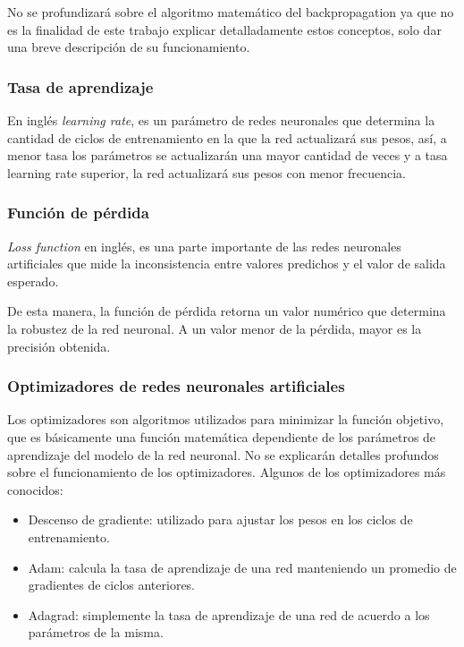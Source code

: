 \documentclass[a4paper,12pt,oneside,spanish]{book}
\begin{document}
No se profundizará sobre el algoritmo matemático del backpropagation ya que no es la finalidad de este trabajo explicar detalladamente estos conceptos, solo dar una breve descripción de su funcionamiento.\par


\subsubsection{Tasa de aprendizaje}
En inglés \textit{learning rate}, es un parámetro de redes neuronales que determina la cantidad de ciclos de entrenamiento en la que la red actualizará sus pesos, así, a menor tasa los parámetros se actualizarán una mayor cantidad de veces y a tasa learning rate superior, la red actualizará sus pesos con menor frecuencia.

\subsubsection{Función de pérdida}
\textit{Loss function} en inglés, es una parte importante de las redes neuronales artificiales que mide la inconsistencia entre valores predichos y el valor de salida esperado. \par

De esta manera, la función de pérdida retorna un valor numérico que determina la robustez de la red neuronal. A un valor menor de la pérdida, mayor es la precisión obtenida.\par

\subsubsection{Optimizadores de redes neuronales artificiales}
Los optimizadores son algoritmos utilizados para minimizar la función objetivo, que es básicamente una función matemática dependiente de los parámetros de aprendizaje del modelo de la red neuronal. No se explicarán detalles profundos sobre el funcionamiento de los optimizadores. Algunos de los optimizadores más conocidos:

\begin{itemize}
	\item Descenso de gradiente: utilizado para ajustar los pesos en los ciclos de entrenamiento.
	\item Adam: calcula la tasa de aprendizaje de una red manteniendo un promedio de gradientes de ciclos anteriores.
	\item Adagrad: simplemente la tasa de aprendizaje de una red de acuerdo a los parámetros de la misma.
\end{itemize}
\end{document}
